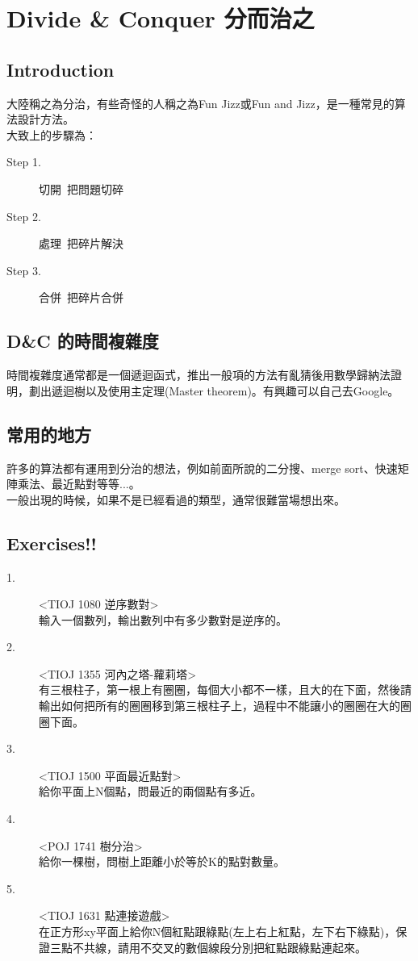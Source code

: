 \documentclass{article}
\begin{document}
\section{Divide \& Conquer 分而治之}
\subsection*{Introduction}
大陸稱之為分治，有些奇怪的人稱之為Fun Jizz或Fun and Jizz，是一種常見的算法設計方法。\\
大致上的步驟為：
\begin{description}
\item[ Step 1.]切開~把問題切碎
\item[ Step 2.]處理~把碎片解決
\item[ Step 3.]合併~把碎片合併
\end{description}

\subsection{D\&C 的時間複雜度}
時間複雜度通常都是一個遞迴函式，推出一般項的方法有亂猜後用數學歸納法證明，劃出遞迴樹以及使用主定理(Master theorem)。有興趣可以自己去Google。

\subsection{常用的地方}
許多的算法都有運用到分治的想法，例如前面所說的二分搜、merge sort、快速矩陣乘法、最近點對等等...。\\
一般出現的時候，如果不是已經看過的類型，通常很難當場想出來。


\subsection{Exercises!!}

\begin{description}
\item[ 1.]<TIOJ 1080 逆序數對>\\
輸入一個數列，輸出數列中有多少數對是逆序的。
\item[ 2.]<TIOJ 1355 河內之塔-蘿莉塔>\\
有三根柱子，第一根上有圈圈，每個大小都不一樣，且大的在下面，然後請輸出如何把所有的圈圈移到第三根柱子上，過程中不能讓小的圈圈在大的圈圈下面。
\item[ 3.]<TIOJ 1500 平面最近點對>\\
給你平面上N個點，問最近的兩個點有多近。
\item[ 4.]<POJ 1741 樹分治>\\
給你一棵樹，問樹上距離小於等於K的點對數量。
\item[ 5.]<TIOJ 1631 點連接遊戲>\\
在正方形xy平面上給你N個紅點跟綠點(左上右上紅點，左下右下綠點)，保證三點不共線，請用不交叉的數個線段分別把紅點跟綠點連起來。
\end{description}
\end{document}
